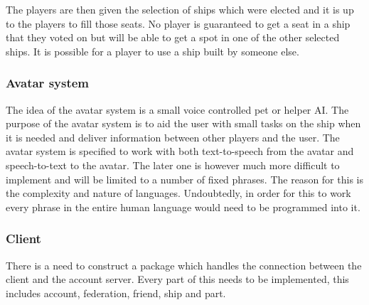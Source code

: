 \documentclass[11pt]{report}
\begin{document}
The players are then given the selection of ships which were elected and it is up to the players to fill those seats. No player is guaranteed to get a seat in a ship that they voted on but will be able to get a spot in one of the other selected ships. It is possible for a player to use a ship built by someone else.
\subsubsection{Avatar system}

The idea of the avatar system is a small voice controlled pet or helper AI. The purpose of the avatar system is to aid the user with small tasks on the ship when it is needed and deliver information between other players and the user. The avatar system is specified to work with both text-to-speech from the avatar and speech-to-text to the avatar. The later one is however much more difficult to implement and will be limited to a number of fixed phrases. The reason for this is the complexity and nature of languages. Undoubtedly, in order for this to work every phrase in the entire human language would need to be programmed into it.
\subsubsection{Client}

There is a need to construct a package which handles the connection between the client and the account server. Every part of this needs to be implemented, this includes account, federation, friend, ship and part.
\end{document}
